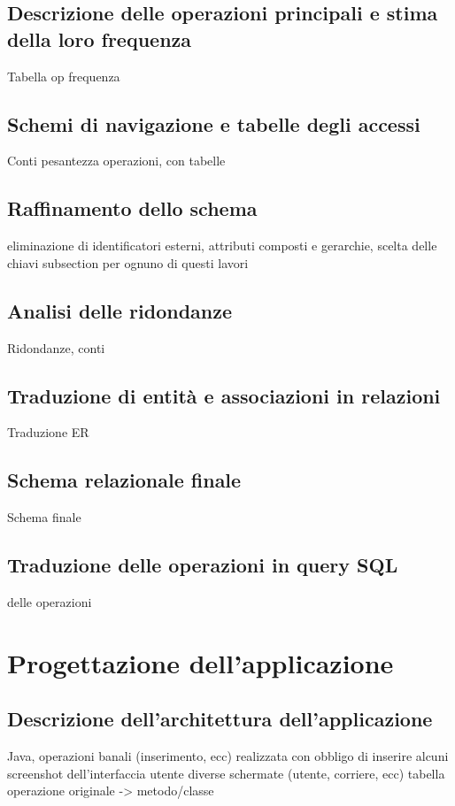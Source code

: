 \documentclass{report}
\begin{document}
\section{Descrizione delle operazioni principali e stima della loro frequenza}
Tabella op frequenza
\section{Schemi di navigazione e tabelle degli accessi}
Conti pesantezza operazioni, con tabelle
\section{Raffinamento dello schema}
eliminazione di identificatori esterni, attributi composti e gerarchie, scelta delle chiavi
subsection per ognuno di questi lavori
\section{Analisi delle ridondanze}
Ridondanze, conti
\section{Traduzione di entità e associazioni in relazioni}
Traduzione ER
\section{Schema relazionale finale}
Schema finale
\section{Traduzione delle operazioni in query SQL}
delle operazioni

\chapter{Progettazione dell'applicazione}
\section{Descrizione dell'architettura dell'applicazione}
Java, operazioni banali (inserimento, ecc)
realizzata con obbligo di inserire alcuni screenshot dell'interfaccia utente
diverse schermate (utente, corriere, ecc)
tabella operazione originale -> metodo/classe
\end{document}
